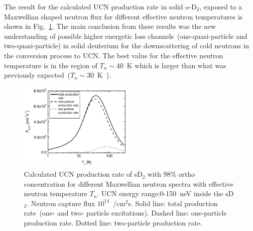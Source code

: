 
The result for the calculated UCN production rate in solid o-D$_2$,
exposed to a Maxwellian shaped neutron flux for different effective
neutron temperatures is shown in
Fig.~\ref{fig:sD2_production_rate}. The main conclusion from these
results was the new understanding of possible higher energetic loss
channels~(one-quasi-particle and two-quasi-particle) in solid
deuterium for the downscattering of cold neutrons in the conversion
process to UCN. The best value for the effective neutron temperature
is in the region of $T_n \sim 40$~K which is larger than what was
previously expected~($T_n \sim 30$~K~\cite{Yu1986}).


\begin{figure}[h!]
\begin{center}
  \includegraphics[width=0.5\textwidth]{Frei2010_P.PNG} \caption{\cite{Frei2010}
    Calculated UCN production rate of sD$_2$ with 98\% ortho
    concentration for different Maxwellian neutron spectra with
    effective neutron temperature $T_n$. UCN energy range:0-150~neV
    inside the sD$_2$. Neutron capture flux $10^{14}$~/cm$^2$s. Solid
    line: total production rate~(one- and two- particle
    excitations). Dashed line: one-particle production rate. Dotted
    line: two-particle production rate.}
    \label{fig:sD2_production_rate}
    \end{center}
\end{figure} 







